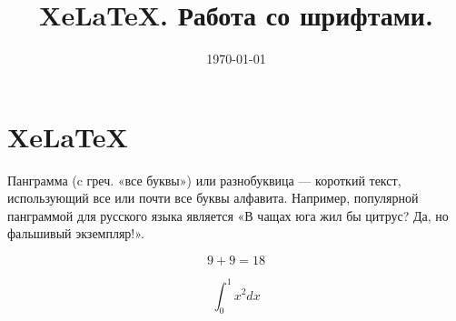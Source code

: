 \documentclass[12pt,a4paper]{article}
\title{Xe\LaTeX. Работа со шрифтами.}
\date{\today}
\theoremstyle{plain}              %
\theoremstyle{definition}         %
\begin{document}
\maketitle

\tableofcontents


\section{Xe\LaTeX}

Панграмма (c греч. «все буквы») или разнобуквица — короткий текст, использующий все или почти все буквы алфавита. Например, популярной панграммой для русского языка является «В чащах юга жил бы цитрус? Да, но фальшивый экземпляр!».


\Large{}

\[ 9 + 9 = 18 \] 

\[ \int_{0}^{1} x^2 dx  \]

\end{document}
